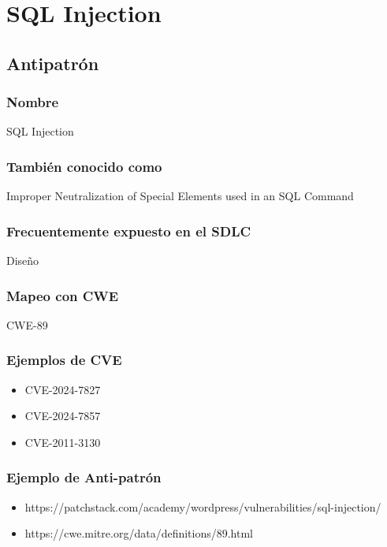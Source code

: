 \chapter{SQL Injection}

\section{Antipatrón}

\subsection*{Nombre}
SQL Injection

\subsection*{También conocido como}
Improper Neutralization of Special Elements used in an SQL Command

\subsection*{Frecuentemente expuesto en el SDLC} 
Diseño

\subsection*{Mapeo con CWE} 
CWE-89

\subsection*{Ejemplos de CVE} 
\begin{itemize}
    \item CVE-2024-7827
    \item CVE-2024-7857
    \item CVE-2011-3130
\end{itemize}

\subsection*{Ejemplo de Anti-patrón}
\begin{itemize}
    \item https://patchstack.com/academy/wordpress/vulnerabilities/sql-injection/
    \item https://cwe.mitre.org/data/definitions/89.html
    
\end{itemize}

